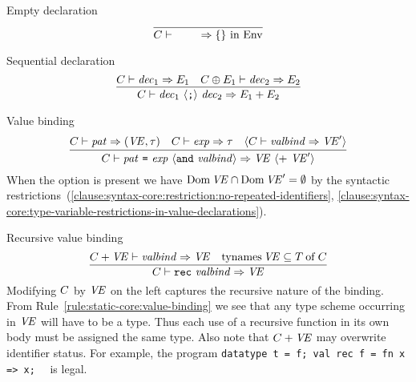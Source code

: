 \begin{sml-rule}{Empty declaration}
\begin{equation}\label{rule:static-core:empty-declaration}
\vcenter{\infer{\C\ts\emptydec\ra\emptymap\ \In\ \Env}{}}
\end{equation}
\end{sml-rule}

\begin{sml-rule}{Sequential declaration}
\begin{equation}\label{rule:static-core:sequential-declaration}
  \vcenter{\infer{\C\ts\seqdec\ra\plusmap{E_{1}}{E_{2}}}
    {\C\ts\dec_{1}\ra\E_{1}
      & \C\oplus\E_{1}\ts\dec_{2}\ra\E_{2}}}
\end{equation}
\end{sml-rule}


\begin{sml-rule}{Value binding}
\begin{equation}\label{rule:static-core:value-binding}
  \vcenter{\infer{\C\ts\longvalbind\ra\VE\ \optional{ +\ \VE'}}
    {\C\ts\pat\ra(\VE,\tau)
      & \C\ts\exp\ra\tau
      & \optional{\C\ts\valbind\ra\VE'}}}
\end{equation}
When the option is present we have $\mathop{\rm Dom}\nolimits\textit{V\kern-.05emE\/}\cap \mathop{\rm Dom}\nolimits\textit{V\kern-.05emE\/}' = \emptyset$ by
the syntactic
restrictions~(\oldS\oldS\ref{clause:syntax-core:restriction:no-repeated-identifiers}, \ref{clause:syntax-core:type-variable-restrictions-in-value-declarations}).
\end{sml-rule}

\begin{sml-rule}{Recursive value binding}
\begin{equation}\label{rule:static-core:recursive-value-binding}
  \vcenter{\infer{\C\ts\recvalbind\ra\VE}
    {\C+\VE\ts\valbind\ra\VE
      & \TyNamesFcn\VE\subseteq\of{\T}{\C}}}
\end{equation}
Modifying $C$ by $\textit{V\kern-.05emE\/}$ on the left captures the 
recursive nature of the binding. From Rule~\eqref{rule:static-core:value-binding} we see that any
type scheme occurring in $\textit{V\kern-.05emE\/}$ will have to be a type. Thus each use of a
recursive function in its own body must be assigned the same type.
Also note that $C+\textit{V\kern-.05emE\/}$ may overwrite 
identifier status. For example, the program
    {\tt datatype t = f; val rec f = fn x => x;}~~  is legal.
\end{sml-rule}


